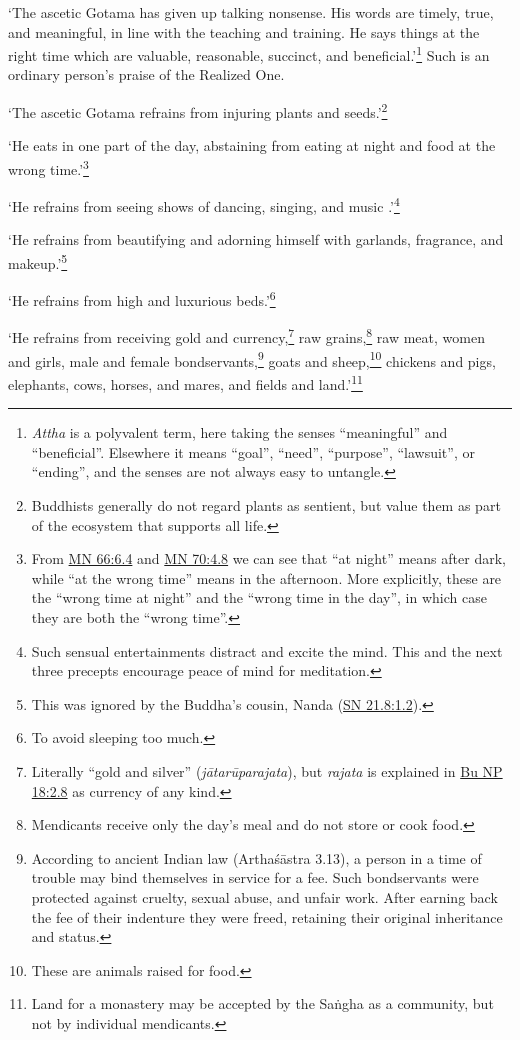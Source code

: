 \documentclass[12pt,openany]{book}%
\begin{document}
‘The ascetic Gotama has given up talking nonsense. His words are timely, true, and meaningful, in line with the teaching and training. He says things at the right time which are valuable, reasonable, succinct, and beneficial.’\footnote{\textit{Attha} is a polyvalent term, here taking the senses  “meaningful” and “beneficial”. Elsewhere it means “goal”, “need”, “purpose”, “lawsuit”, or “ending”, and the senses are not always easy to untangle. } Such is an ordinary person’s praise of the Realized One. 

‘The ascetic Gotama refrains from injuring plants and seeds.’\footnote{Buddhists generally do not regard plants as sentient, but value them as part of the ecosystem that supports all life. } 

‘He eats in one part of the day, abstaining from eating at night and food at the wrong time.’\footnote{From \href{https://suttacentral.net/mn66/en/sujato\#6.4}{MN 66:6.4} and \href{https://suttacentral.net/mn70/en/sujato\#4.8}{MN 70:4.8} we can see that “at night” means after dark, while “at the wrong time” means in the afternoon. More explicitly, these are the “wrong time at night” and the “wrong time in the day”, in which case they are both the “wrong time”. } 

‘He refrains from seeing shows of dancing, singing, and music .’\footnote{Such sensual entertainments distract and excite the mind. This and the next three precepts encourage peace of mind for meditation. } 

‘He refrains from beautifying and adorning himself with garlands, fragrance, and makeup.’\footnote{This was ignored by the Buddha’s cousin, Nanda (\href{https://suttacentral.net/sn21.8/en/sujato\#1.2}{SN 21.8:1.2}). } 

‘He refrains from high and luxurious beds.’\footnote{To avoid sleeping too much. } 

‘He refrains from receiving gold and currency,\footnote{Literally “gold and silver” (\textit{\textsanskrit{jātarūparajata}}), but \textit{rajata} is explained in \href{https://suttacentral.net/pli-tv-bu-vb-np18/en/sujato\#2.8}{Bu NP 18:2.8} as currency of any kind. } raw grains,\footnote{Mendicants receive only the day’s meal and do not store or cook food. } raw meat, women and girls, male and female bondservants,\footnote{According to ancient Indian law (\textsanskrit{Arthaśāstra} 3.13), a person in a time of trouble may bind themselves in service for a fee. Such bondservants were protected against cruelty, sexual abuse, and unfair work. After earning back the fee of their indenture they were freed, retaining their original inheritance and status. } goats and sheep,\footnote{These are animals raised for food. } chickens and pigs, elephants, cows, horses, and mares, and fields and land.’\footnote{Land for a monastery may be accepted by the \textsanskrit{Saṅgha} as a community, but not by individual mendicants. } 
\end{document}
